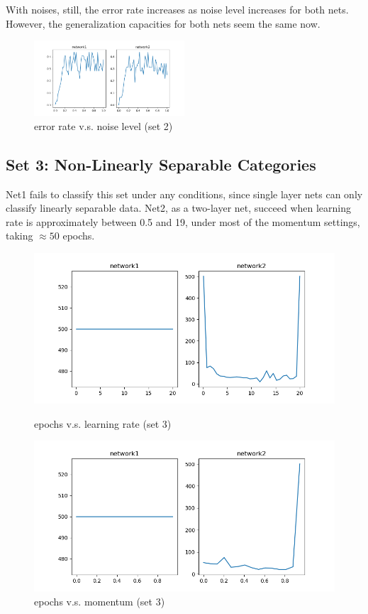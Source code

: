 \documentclass{article}
\begin{document}
With noises, still, the error rate increases as noise level increases for both nets. However, the generalization capacities for both nets seem the same now.
\begin{figure}[!ht]
    \centering
    \includegraphics[width=0.5\textwidth]{part1set2g.png}
    \caption{error rate v.s. noise level (set 2)}
\end{figure}

\subsection*{Set 3: Non-Linearly Separable Categories}
Net1 fails to classify this set under any conditions, since single layer nets can only classify linearly separable data. Net2, as a two-layer net, succeed when learning rate is approximately between 0.5 and 19, under most of the momentum settings, taking $\approx50$ epochs.
\begin{figure}[!ht]
    \begin{minipage}{0.5\textwidth}
        \centering
        \includegraphics[width=\linewidth]{part1set3.png} 
        \caption{epochs v.s. learning rate (set 3)}   
    \end{minipage}\hfill
    \begin{minipage}{0.5\textwidth}
        \centering
        \includegraphics[width=\linewidth]{part1set3m.png}    
        \caption{epochs v.s. momentum (set 3)}
    \end{minipage}
\end{figure}
\end{document}
